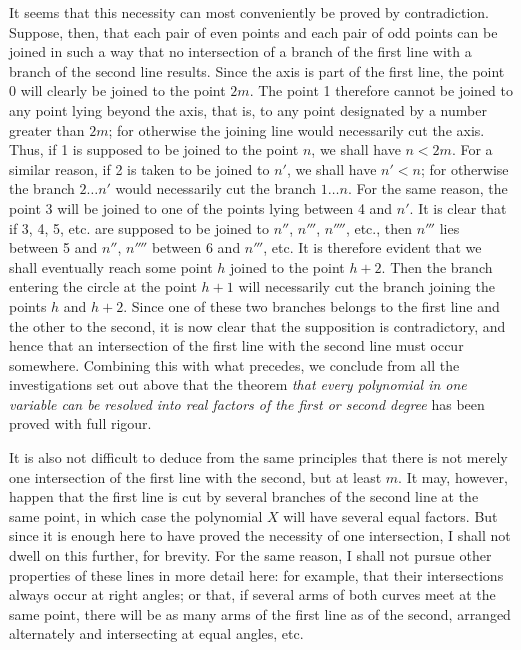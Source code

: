  It seems that this necessity can most conveniently be proved by contradiction. Suppose, then, that each pair of even points and each pair of odd points can be joined in such a way that no intersection of a branch of the first line with a branch of the second line results. Since the axis is part of the first line, the point 0 will clearly be joined to the point $2m$. The point 1 therefore cannot be joined to any point lying beyond the axis, that is, to any point designated by a number greater than $2m$; for otherwise the joining line would necessarily cut the axis. Thus, if 1 is supposed to be joined to the point $n$, we shall have $n<2m$. For a similar reason, if 2 is taken to be joined to $n'$, we shall have $n'<n$; for otherwise the branch $2\ldots n'$ would necessarily cut the branch $1\ldots n$. For the same reason, the point 3 will be joined to one of the points lying between 4 and $n'$. It is clear that if 3, 4, 5, etc. are supposed to be joined to $n''$, $n'''$, $n''''$, etc., then $n'''$ lies between 5 and $n''$, $n''''$ between 6 and $n'''$, etc. It is therefore evident that we shall eventually reach some point $h$ joined to the point $h+2$. Then the branch entering the circle at the point $h+1$ will necessarily cut the branch joining the points $h$ and $h+2$. Since one of these two branches belongs to the first line and the other to the second, it is now clear that the supposition is contradictory, and hence that an intersection of the first line with the second line must occur somewhere.
Combining this with what precedes, we conclude from all the investigations set out above that the theorem \textit{that every polynomial in one variable can be resolved into real factors of the first or second degree} has been proved with full rigour.

 It is also not difficult to deduce from the same principles that there is not merely one intersection of the first line with the second, but at least $m$. It may, however, happen that the first line is cut by several branches of the second line at the same point, in which case the polynomial $X$ will have several equal factors. But since it is enough here to have proved the necessity of one intersection, I shall not dwell on this further, for brevity. For the same reason, I shall not pursue other properties of these lines in more detail here: for example, that their intersections always occur at right angles; or that, if several arms of both curves meet at the same point, there will be as many arms of the first line as of the second, arranged alternately and intersecting at equal angles, etc.

